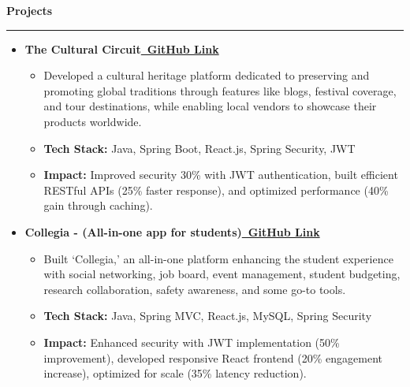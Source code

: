 \documentclass[11pt,a4paper]{article}
\newcommand{\sectionheading}[1]{%
    \vspace{0.5em}%
    {\large\headingfont\color{primary}\textbf{#1}}%
    \vspace{0.25em}%
    \hrule%
    \vspace{0.5em}%
}
\newenvironment{cvitemize}{%
    \begin{itemize}[leftmargin=1.5em, nosep, noitemsep]
}{%
    \end{itemize}
}
\begin{document}
\sectionheading{Projects}
\begin{cvitemize}
    \item \textbf{The Cultural Circuit}\hfill \href{https://github.com/K-Nishant-18/cultural-circuit}{\color{primary}\textbf{\faGithub\ GitHub Link}}
    \begin{cvitemize}
        \item Developed a cultural heritage platform dedicated to preserving and promoting global traditions through features like blogs, festival coverage, and tour destinations, while enabling local vendors to showcase their products worldwide.
        \item \textbf{Tech Stack:} Java, Spring Boot, React.js, Spring Security, JWT
        \item \textbf{Impact:} Improved security 30\% with JWT authentication, built efficient RESTful APIs (25\% faster response), and optimized performance (40\% gain through caching).
    \end{cvitemize}

    \vspace{0.7em} %
    
    \item \textbf{Collegia - (All-in-one app for students)}\hfill \href{https://github.com/K-Nishant-18/collegia}{\color{primary}\textbf{\faGithub\ GitHub Link}}
    \begin{cvitemize}
        \item Built ‘Collegia,’ an all-in-one platform enhancing the student experience with social networking, job board, event management, student budgeting, research collaboration, safety awareness, and some go-to tools.  
        \item \textbf{Tech Stack:} Java, Spring MVC, React.js, MySQL, Spring Security
        \item \textbf{Impact:} Enhanced security with JWT implementation (50\% improvement), developed responsive React frontend (20\% engagement increase), optimized for scale (35\% latency reduction).
    \end{cvitemize}
\end{cvitemize}
\end{document}

